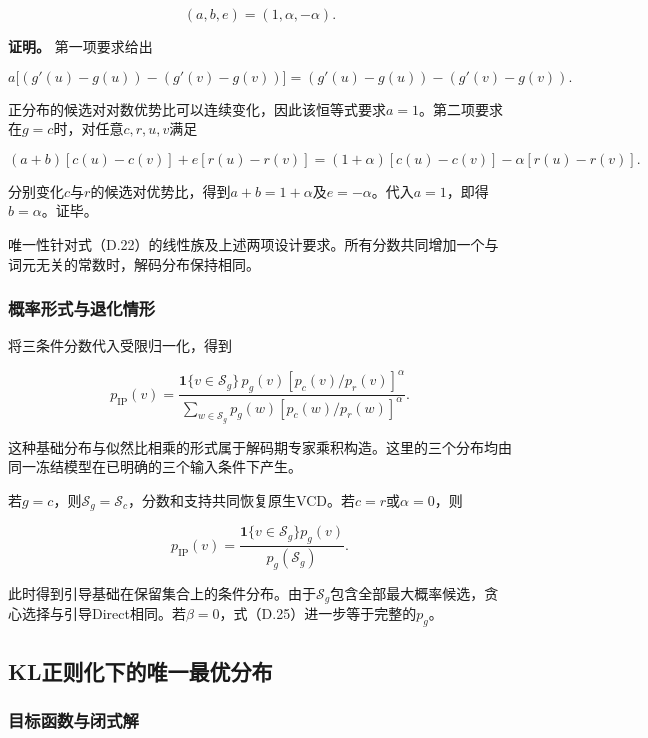 \[
(a,b,e)=(1,\alpha,-\alpha).
\tag{D.23}
\]

\textbf{证明。} 第一项要求给出

\[
a\big[(g'(u)-g(u))-(g'(v)-g(v))\big]
=(g'(u)-g(u))-(g'(v)-g(v)).
\]

正分布的候选对对数优势比可以连续变化，因此该恒等式要求\(a=1\)。第二项要求在\(g=c\)时，对任意\(c,r,u,v\)满足

\[
(a+b)[c(u)-c(v)]+e[r(u)-r(v)]
=(1+\alpha)[c(u)-c(v)]-\alpha[r(u)-r(v)].
\]

分别变化\(c\)与\(r\)的候选对优势比，得到\(a+b=1+\alpha\)及\(e=-\alpha\)。代入\(a=1\)，即得\(b=\alpha\)。证毕。

唯一性针对式（D.22）的线性族及上述两项设计要求。所有分数共同增加一个与词元无关的常数时，解码分布保持相同。

\subsubsection{概率形式与退化情形}\label{ux6982ux7387ux5f62ux5f0fux4e0eux9000ux5316ux60c5ux5f62}

将三条件分数代入受限归一化，得到

\[
p_{\mathrm{IP}}(v)
=\frac{\mathbf1\{v\in\mathcal S_g\}\,p_g(v)
\left[p_c(v)/p_r(v)\right]^\alpha}
{\sum_{w\in\mathcal S_g}p_g(w)\left[p_c(w)/p_r(w)\right]^\alpha}.
\tag{D.24}
\]

这种基础分布与似然比相乘的形式属于解码期专家乘积构造\citep{liu2021dexperts}。这里的三个分布均由同一冻结模型在已明确的三个输入条件下产生。

若\(g=c\)，则\(\mathcal S_g=\mathcal S_c\)，分数和支持共同恢复原生VCD。若\(c=r\)或\(\alpha=0\)，则

\[
p_{\mathrm{IP}}(v)
=\frac{\mathbf1\{v\in\mathcal S_g\}p_g(v)}{p_g(\mathcal S_g)}.
\tag{D.25}
\]

此时得到引导基础在保留集合上的条件分布。由于\(\mathcal S_g\)包含全部最大概率候选，贪心选择与引导Direct相同。若\(\beta=0\)，式（D.25）进一步等于完整的\(p_g\)。

\subsection{KL正则化下的唯一最优分布}\label{klux6b63ux5219ux5316ux4e0bux7684ux552fux4e00ux6700ux4f18ux5206ux5e03}

\subsubsection{目标函数与闭式解}\label{ux76eeux6807ux51fdux6570ux4e0eux95edux5f0fux89e3}

